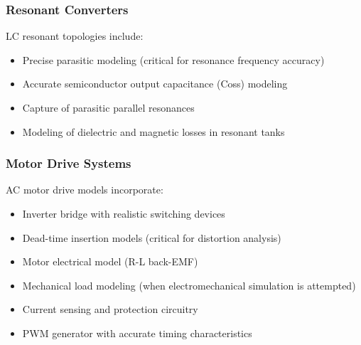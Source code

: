 \subsubsection{Resonant Converters}
LC resonant topologies include:
\begin{itemize}
    \item Precise parasitic modeling (critical for resonance frequency accuracy)
    \item Accurate semiconductor output capacitance (Coss) modeling
    \item Capture of parasitic parallel resonances
    \item Modeling of dielectric and magnetic losses in resonant tanks
\end{itemize}

\subsubsection{Motor Drive Systems}
AC motor drive models incorporate:
\begin{itemize}
    \item Inverter bridge with realistic switching devices
    \item Dead-time insertion models (critical for distortion analysis)
    \item Motor electrical model (R-L back-EMF)
    \item Mechanical load modeling (when electromechanical simulation is attempted)
    \item Current sensing and protection circuitry
    \item PWM generator with accurate timing characteristics
\end{itemize}

